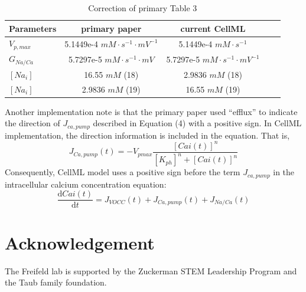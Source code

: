 \documentclass[fleqn,10pt]{physiome}
\begin{document}
\begin{table}[h!]\centering

\caption{Correction of primary Table 3}\label{tab:parameters}

\begin{tabular}{lccrr}
\toprule
Parameters & primary paper & current CellML\\
\midrule
$V_{p,max}$ & 5.1449e-4 $mM\cdot s^{-1} \cdot mV^{-1}$  & 5.1449e-4 $mM\cdot s^{-1} $ \\
$G_{Na/Ca}$ & 5.7297e-5 $mM\cdot s^{-1} \cdot mV$  & 5.7297e-5 $mM\cdot s^{-1} \cdot mV^{-1}$ \\
$[Na_{i}]$ & 16.55 $mM$ (18) & 2.9836 $mM$ (18)\\
$[Na_{i}]$ & 2.9836 $mM$ (19) & 16.55 $mM$ (19)\\
\bottomrule
\end{tabular}
\end{table}

Another implementation note is that the primary paper used ``efflux'' to indicate the direction of $J_{ca,pump}$ described in Equation (4) with a positive sign. In CellML implementation, the direction information is included in the equation. That is, 
\begin{equation}
    J_{Ca,pump}(t)=-V_{pmax}\dfrac{[Cai(t)]^n}{[K_{ph}]^n+[Cai(t)]^n}
\end{equation}
Consequently, CellML model uses a positive sign before the term $J_{ca,pump}$ in the intracellular calcium concentration equation:
\begin{equation}
    \frac{\mathrm{d}Cai(t) }{\mathrm{d} t}=J_{VOCC}(t)+J_{Ca,pump}(t)+J_{Na/Ca}(t)
\end{equation}

\section{Acknowledgement}
The Freifeld lab is supported by the Zuckerman STEM Leadership Program and the Taub family foundation.


\end{document}
